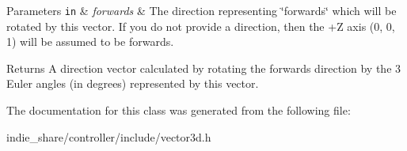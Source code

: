 \begin{DoxyParams}[1]{Parameters}
\mbox{\tt in}  & {\em forwards} & The direction representing \char`\"{}forwards\char`\"{} which will be rotated by this vector. If you do not provide a direction, then the +Z axis (0, 0, 1) will be assumed to be forwards. \\
\hline
\end{DoxyParams}
\begin{DoxyReturn}{Returns}
A direction vector calculated by rotating the forwards direction by the 3 Euler angles (in degrees) represented by this vector. 
\end{DoxyReturn}


The documentation for this class was generated from the following file\+:\begin{DoxyCompactItemize}
\item 
indie\+\_\+share/controller/include/vector3d.\+h\end{DoxyCompactItemize}
